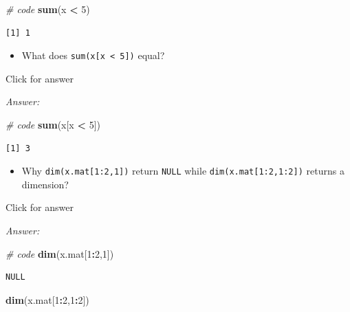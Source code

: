 \documentclass[
]{book}
\newenvironment{Shaded}{\begin{snugshade}}{\end{snugshade}}
\newcommand{\CommentTok}[1]{\textcolor[rgb]{0.56,0.35,0.01}{\textit{#1}}}
\newcommand{\DecValTok}[1]{\textcolor[rgb]{0.00,0.00,0.81}{#1}}
\newcommand{\FunctionTok}[1]{\textcolor[rgb]{0.13,0.29,0.53}{\textbf{#1}}}
\newcommand{\NormalTok}[1]{#1}
\newcommand{\SpecialCharTok}[1]{\textcolor[rgb]{0.81,0.36,0.00}{\textbf{#1}}}
\providecommand{\tightlist}{%
  \setlength{\itemsep}{0pt}\setlength{\parskip}{0pt}}
\begin{document}
\begin{Shaded}
\begin{Highlighting}[]
\CommentTok{\# code}
\FunctionTok{sum}\NormalTok{(x }\SpecialCharTok{\textless{}} \DecValTok{5}\NormalTok{)}
\end{Highlighting}
\end{Shaded}

\begin{verbatim}
[1] 1
\end{verbatim}

\begin{itemize}
\tightlist
\item
  What does \texttt{sum(x{[}x\ \textless{}\ 5{]})} equal?
\end{itemize}

Click for answer

\emph{Answer:}

\begin{Shaded}
\begin{Highlighting}[]
\CommentTok{\# code}
\FunctionTok{sum}\NormalTok{(x[x }\SpecialCharTok{\textless{}} \DecValTok{5}\NormalTok{])}
\end{Highlighting}
\end{Shaded}

\begin{verbatim}
[1] 3
\end{verbatim}

\begin{itemize}
\tightlist
\item
  Why \texttt{dim(x.mat{[}1:2,1{]})} return \texttt{NULL} while \texttt{dim(x.mat{[}1:2,1:2{]})} returns a dimension?
\end{itemize}

Click for answer

\emph{Answer:}

\begin{Shaded}
\begin{Highlighting}[]
\CommentTok{\# code}
\FunctionTok{dim}\NormalTok{(x.mat[}\DecValTok{1}\SpecialCharTok{:}\DecValTok{2}\NormalTok{,}\DecValTok{1}\NormalTok{])}
\end{Highlighting}
\end{Shaded}

\begin{verbatim}
NULL
\end{verbatim}

\begin{Shaded}
\begin{Highlighting}[]
\FunctionTok{dim}\NormalTok{(x.mat[}\DecValTok{1}\SpecialCharTok{:}\DecValTok{2}\NormalTok{,}\DecValTok{1}\SpecialCharTok{:}\DecValTok{2}\NormalTok{])}
\end{Highlighting}
\end{Shaded}
\end{document}
